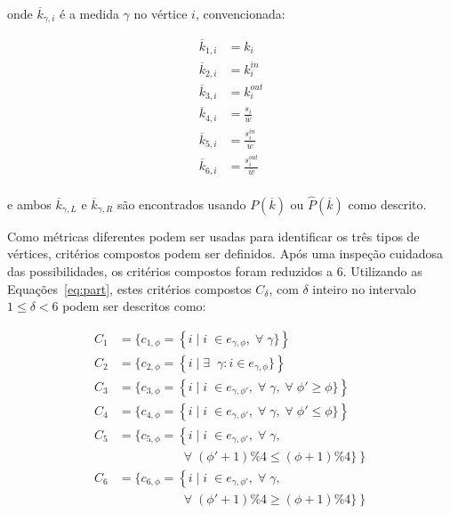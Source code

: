 \documentclass[a4paper,openright,12pt]{report} %
\begin{document}
\noindent onde $\overline{k}_{\gamma,i}$ é a medida $\gamma$ no vértice $i$,
convencionada:

\begin{equation}
    \begin{split}
        \overline{k}_{1,i}&=k_i \\
        \overline{k}_{2,i}&=k_i^{in} \\
        \overline{k}_{3,i}&=k_i^{out} \\
        \overline{k}_{4,i}&=\frac{s_i}{\overline{w}} \\
        \overline{k}_{5,i}&=\frac{s_i^{in}}{\overline{w}} \\
        \overline{k}_{6,i}&=\frac{s_i^{out}}{\overline{w}} \\
    \end{split}
\end{equation}

\noindent e ambos $\overline{k}_{\gamma,L}$ e $\overline{k}_{\gamma,R}$ são encontrados  usando
$P(\overline{k})$ ou $\hat{P}(\overline{k})$
como descrito.

Como métricas diferentes podem ser usadas para identificar
os três tipos de vértices, critérios compostos podem ser
definidos. Após uma inspeção cuidadosa das possibilidades,
os critérios compostos foram reduzidos a 6.
Utilizando as Equações~\ref{eq:part}, estes critérios compostos $C_\delta$, com $\delta$ inteiro no intervalo $1\leq\delta<6$ podem ser descritos como:

\begin{equation}
    \begin{split}
        C_1&=\{c_{1,\phi}=\left\{i\mid i\;\in e_{\gamma,\phi}, \;\forall\; \gamma\}\right\} \\
        C_2&=\{c_{2,\phi}=\left\{i\mid \exists \;\;\gamma: i \in e_{\gamma,\phi}\}\right\} \\
        C_3&=\{c_{3,\phi}=\left\{i\mid i\;\in e_{\gamma,\phi'}, \;\forall\; \gamma,\;\forall\;\phi'\geq \phi\}\right\} \\
        C_4&=\{c_{4,\phi}=\left\{i\mid i\;\in e_{\gamma,\phi'}, \;\forall\; \gamma,\;\forall\;\phi'\leq \phi\}\right\} \\
        C_5&=\{c_{5,\phi}=\left\{i\mid i\;\in e_{\gamma,\phi'}, \;\forall\; \gamma,\right.\\
                                                                                                                                    &\;\;\;\;\;\;\;\;\;\;\;\;\;\;\;\;\;\; \left.\;\forall\;(\phi'+1)\%4\leq (\phi+1)\%4\}\right\} \\
        C_6&=\{c_{6,\phi}=\left\{i\mid i\;\in e_{\gamma,\phi'}, \;\forall\; \gamma,\right.\\
                                                                                                                                    &\;\;\;\;\;\;\;\;\;\;\;\;\;\;\;\;\;\; \left.\;\forall\;(\phi'+1)\%4\geq (\phi+1)\%4\}\right\} \\
    \end{split}
\end{equation}
\end{document}
